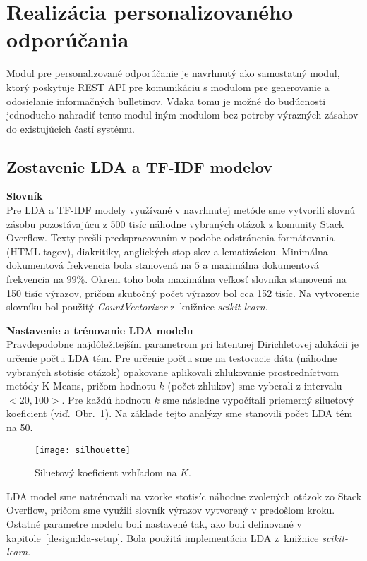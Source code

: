 \section{Realizácia personalizovaného odporúčania}
\label{impl:rec}

Modul pre personalizované odporúčanie je navrhnutý ako samostatný modul, ktorý poskytuje REST API pre komunikáciu
s modulom pre generovanie a odosielanie informačných bulletinov. Vďaka tomu je možné do budúcnosti jednoducho nahradiť
tento modul iným modulom bez potreby výrazných zásahov do existujúcich častí systému.

\subsection{Zostavenie LDA a TF-IDF modelov}

\textbf{Slovník}\\
Pre LDA a TF-IDF modely využívané v navrhnutej metóde sme vytvorili slovnú zásobu pozostávajúcu z 500 tisíc náhodne vybraných
otázok z komunity Stack Overflow. Texty prešli predspracovaním v podobe odstránenia formátovania (HTML tagov), diakritiky,
anglických stop slov a lematizáciou. Minimálna dokumentová frekvencia bola stanovená na $5$ a maximálna dokumentová frekvencia na $99\%$.
Okrem toho bola maximálna veľkosť slovníka stanovená na 150 tisíc výrazov, pričom skutočný počet výrazov bol cca 152 tisíc.
Na vytvorenie slovníku bol použitý \textit{CountVectorizer} z~knižnice \textit{scikit-learn}.

\textbf{Nastavenie a trénovanie LDA modelu}\\
Pravdepodobne najdôležitejším parametrom pri latentnej Dirichletovej alokácii je určenie počtu LDA tém. Pre určenie počtu sme
na testovacie dáta (náhodne vybraných stotisíc otázok) opakovane aplikovali zhlukovanie prostredníctvom metódy K-Means, pričom
hodnotu $k$ (počet zhlukov) sme vyberali z intervalu $<20,100>$. Pre každú hodnotu $k$ sme následne vypočítali priemerný siluetový koeficient
(viď.~Obr.~\ref{fig:silhouette}). Na základe tejto analýzy sme stanovili počet LDA tém na 50.

\begin{figure}[H]\begin{center}
\texttt{[image: silhouette]}
\caption{Siluetový koeficient vzhľadom na $K$. \label{fig:silhouette}}\end{center}
\end{figure}

LDA model sme natrénovali na vzorke stotisíc náhodne zvolených otázok zo Stack Overflow, pričom sme využili slovník výrazov
vytvorený v predošlom kroku. Ostatné parametre modelu boli nastavené tak, ako boli definované v kapitole~\ref{design:lda-setup}.
Bola použitá implementácia LDA z~knižnice \textit{scikit-learn}.

